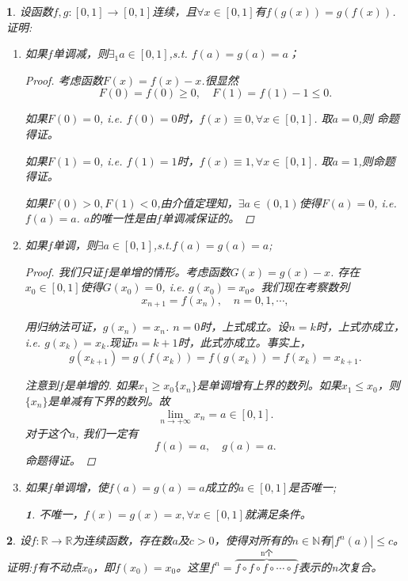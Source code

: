 \documentclass[utf8]{book}
\newtheorem{example}{}[section]             %
\newtheorem{solution}{}
\begin{document}
\begin{example}
设函数$f,g:[0,1]\rightarrow [0,1]$连续，且$\forall x\in [0,1]$有$f(g(x))=g(f(x))$.证明:
\renewcommand\labelenumi{\normalfont(\theenumi)}
\begin{enumerate}
\item 如果$f$单调减，则$\exists_1 a\in[0,1]$,s.t. $f(a)=g(a)=a$；
\begin{proof}考虑函数$F(x) = f(x) - x$.很显然
$$F(0) = f(0) \geq 0, \quad F(1) = f(1) - 1 \leq 0.$$

如果$F(0) = 0$, i.e. $f(0) = 0$时，$f(x)\equiv 0, \forall x\in [0,1]$. 取$a=0$,则
命题得证。

如果$F(1) = 0$, i.e. $f(1) = 1$时，$f(x)\equiv 1, \forall x\in [0,1]$. 取$a=1$,则命题得证。

如果$F(0) >0, F(1) < 0$,由介值定理知，$\exists a\in(0,1)$使得$F(a) = 0$, i.e. $f(a) = a$. $a$的唯一性是由$f$单调减保证的。
\end{proof}
\item 如果$f$单调，则$\exists a\in[0,1]$,s.t.$f(a)=g(a)=a$;
\begin{proof}我们只证$f$是单增的情形。考虑函数$G(x) = g(x) - x$. 存在$x_0\in[0,1]$使得$G(x_0) = 0$, i.e. 
$g(x_0) = x_0$。我们现在考察数列$$x_{n+1}=f(x_{n}), \quad n = 0,1,\cdots,$$

用归纳法可证，$g(x_n) = x_n$. $n=0$时，上式成立。设$n=k$时，上式亦成立，i.e. $g(x_k) = x_k$.现证$n=k+1$时，此式亦成立。事实上，$$g(x_{k+1}) = g(f(x_{k}))  = f(g(x_k))=f(x_k)=x_{k+1}.$$

注意到$f$是单增的. 如果$x_1 \geq x_0$$\{x_n\}$是单调增有上界的数列。如果$x_1\leq x_0$，则$\{x_n\}$是单减有下界的数列。故
$$\displaystyle\lim_{n\to +\infty}x_n = a\in[0,1].$$
对于这个$a$, 我们一定有
$$f(a) = a, \quad g(a) = a.$$
命题得证。
\end{proof}
\item 如果$f$单调增，使$f(a)=g(a)=a$成立的$a\in[0,1]$是否唯一;
\begin{solution}
不唯一，$f(x) = g(x)= x,\forall x\in[0,1]$就满足条件。
\end{solution}
\end{enumerate}
\end{example}
\begin{example}
设$f:\mathbb{R}\rightarrow\mathbb{R}$为连续函数，存在数$a$及$c>0$，使得对所有的$n\in\mathbb{N}$有$|f^n(a)|\leq c$。证明:$f$有不动点$x_0$，即$f(x_0)=x_0$。这里$f^n=\overbrace{f\circ f\circ f\circ\cdots\circ f}^{\text{n个}}$表示的n次复合。
\end{example}
\end{document}
